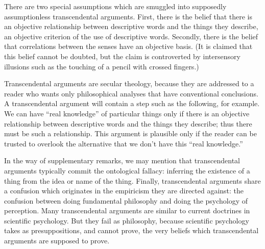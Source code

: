 \begin{enumerate}[label=\textbf{\Alph*.}, wide, nosep, itemsep=1em]
There are two special assumptions which are smuggled into supposedly assumptionless transcendental arguments. First, there is the belief that there is an objective relationship between descriptive words and the things they describe, an objective criterion of the use of descriptive words. Secondly, there is the belief that correlations between the senses have an objective basis. (It is claimed that this belief cannot be doubted, but the claim is controverted by intersensory illusions such as the touching of a pencil with crossed fingers.) 

Transcendental arguments are secular theology, because they are addressed to a reader who wants only philosophical analyses that have conventional conclusions. A transcendental argument will contain a step such as the following, for example. We can have \enquote{real knowledge} of particular things only if there is an objective relationship between descriptive words and the things they describe; thus there must be such a relationship. This argument is plausible only if the reader can be trusted to overlook the alternative that we don't have this \enquote{real knowledge.} 

In the way of supplementary remarks, we may mention that transcendental arguments typically commit the ontological fallacy: inferring the existence of a thing from the idea or name of the thing. Finally, transcendental arguments share a confusion which originates in the empiricism they are directed against: the confusion between doing fundamental philosophy and doing the psychology of perception. Many transcendental arguments are similar to current doctrines in scientific psychology. But they fail as philosophy, because scientific psychology takes as presuppositions, and cannot prove, the very beliefs which transcendental arguments are supposed to prove. 

\end{enumerate}
